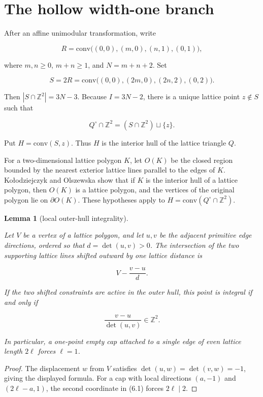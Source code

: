 \documentclass[11pt]{article}
\newtheorem{lemma}[theorem]{Lemma}
\theoremstyle{remark}
\numberwithin{equation}{section}
\begin{document}
\section{The hollow width-one branch}


After an affine unimodular transformation, write

\[
R=\mathrm{conv}\bigl((0,0),(m,0),(n,1),(0,1)\bigr),
\]

where $m,n\ge0$, $m+n\ge1$, and $N=m+n+2$. Set

\[
S=2R=\mathrm{conv}\bigl((0,0),(2m,0),(2n,2),(0,2)\bigr).
\]

Then $|S\cap\mathbb Z^2|=3N-3$. Because $I=3N-2$, there is a unique lattice point $z\notin S$ such that

\[
Q^\circ\cap\mathbb Z^2=(S\cap\mathbb Z^2)\sqcup\{z\}.
\]

Put $H=\mathrm{conv}(S,z)$. Thus $H$ is the interior hull of the lattice triangle $Q$.

For a two-dimensional lattice polygon $K$, let $O(K)$ be the closed region bounded by the nearest exterior lattice lines parallel to the edges of $K$. Ko\l{}odziejczyk and Olszewska \cite[Theorems~2.3--2.4]{ref11} show that if $K$ is the interior hull of a lattice polygon, then $O(K)$ is a lattice polygon, and the vertices of the original polygon lie on $\partial O(K)$. These hypotheses apply to $H=\mathrm{conv}(Q^\circ\cap\mathbb Z^2)$.

\begin{lemma}[local outer-hull integrality]\label{lem:outer-integrality}

Let $V$ be a vertex of a lattice polygon, and let $u,v$ be the adjacent primitive edge directions, ordered so that $d=\det(u,v)>0$. The intersection of the two supporting lattice lines shifted outward by one lattice distance is

\[
V-\frac{v-u}{d}.
\]

If the two shifted constraints are active in the outer hull, this point is integral if and only if

\[
\frac{v-u}{\det(u,v)}\in\mathbb Z^2. \tag{6.1}
\]

In particular, a one-point empty cap attached to a single edge of even lattice length $2\ell$ forces $\ell=1$.

\end{lemma}

\begin{proof}

The displacement $w$ from $V$ satisfies $\det(u,w)=\det(v,w)=-1$, giving the displayed formula. For a cap with local directions $(a,-1)$ and $(2\ell-a,1)$, the second coordinate in (6.1) forces $2\ell\mid2$.
\end{proof}
\end{document}
